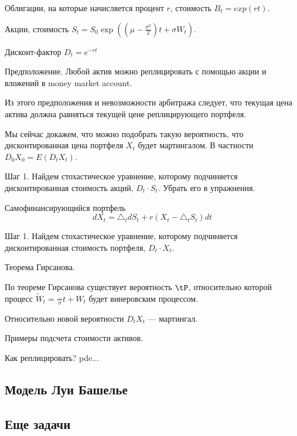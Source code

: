 {Облигации, на которые начисляется процент $r$, стоимость $B_{t}=exp(rt)$.

Акции, стоимость $S_{t}=S_{0}\exp((\mu-\frac{\sigma^{2}}{2})t+\sigma W_{t})$.


Дисконт-фактор $D_t=e^{-rt}$

Предположение. Любой актив можно реплицировать с помощью акции и вложений в money market account.


Из этого предположения и невозможности арбитража следует, что текущая цена актива должна равняться текущей цене реплицирующего портфеля.

Мы сейчас докажем, что можно подобрать такую вероятность, что дисконтированная цена портфеля $X_t$ будет мартингалом. В частности $D_0 X_0=E(D_t X_t)$.



Шаг 1. Найдем стохастическое уравнение, которому подчиняется дисконтированная стоимость акций, $D_t\cdot S_t$. Убрать его в упражнения.

Самофинансирующийся портфель
\begin{equation}
dX_t=\triangle_t dS_t+r(X_t-\triangle_t S_t)dt
\end{equation}

Шаг 1. Найдем стохастическое уравнение, которому подчиняется дисконтированная стоимость портфеля, $D_t\cdot X_t$.


Теорема Гирсанова.

По теореме Гирсанова существует вероятность $\tP$, относительно которой процесс $\tilde{W}_t=\frac{...}{\sigma}t + W_t$ будет винеровским процессом. 


Относительно новой вероятности $D_t X_t$ --- мартингал.


Примеры подсчета стоимости активов.

Как реплицировать? pde...

}\subsection{Модель Луи Башелье} \subsection{Еще задачи}




